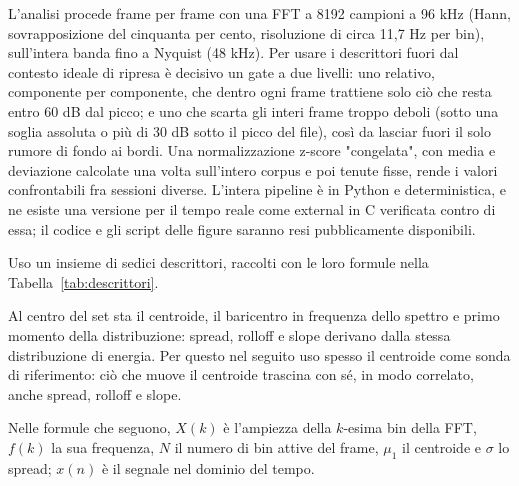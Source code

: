 \documentclass{article}
\begin{document}
L'analisi procede frame per frame con una FFT a 8192 campioni a 96 kHz (Hann, sovrapposizione del cinquanta per cento, risoluzione di circa 11,7 Hz per bin), sull'intera banda fino a Nyquist (48 kHz).%
 Per usare i descrittori fuori dal contesto ideale di ripresa è decisivo un gate a due livelli: uno relativo, componente per componente, che dentro ogni frame trattiene solo ciò che resta entro 60 dB dal picco; e uno che scarta gli interi frame troppo deboli (sotto una soglia assoluta o più di 30 dB sotto il picco del file), così da lasciar fuori il solo rumore di fondo ai bordi. Una normalizzazione z-score "congelata", con media e deviazione calcolate una volta sull'intero corpus e poi tenute fisse, rende i valori confrontabili fra sessioni diverse. L'intera pipeline è in Python e deterministica, e ne esiste una versione per il tempo reale come external in C verificata contro di essa; il codice e gli script delle figure saranno resi pubblicamente disponibili.

Uso un insieme di sedici descrittori, raccolti con le loro formule nella Tabella~\ref{tab:descrittori}.

Al centro del set sta il centroide, il baricentro in frequenza dello spettro e primo momento della distribuzione: spread, rolloff e slope derivano dalla stessa distribuzione di energia. Per questo nel seguito uso spesso il centroide come sonda di riferimento: ciò che muove il centroide trascina con sé,
in modo correlato, anche spread, rolloff e slope.

Nelle formule che seguono, $X(k)$ è l'ampiezza della $k$-esima bin della FFT, $f(k)$ la sua frequenza, $N$ il numero di bin attive del frame, $\mu_1$ il centroide e $\sigma$ lo spread; $x(n)$ è il segnale nel dominio del tempo.
\end{document}
